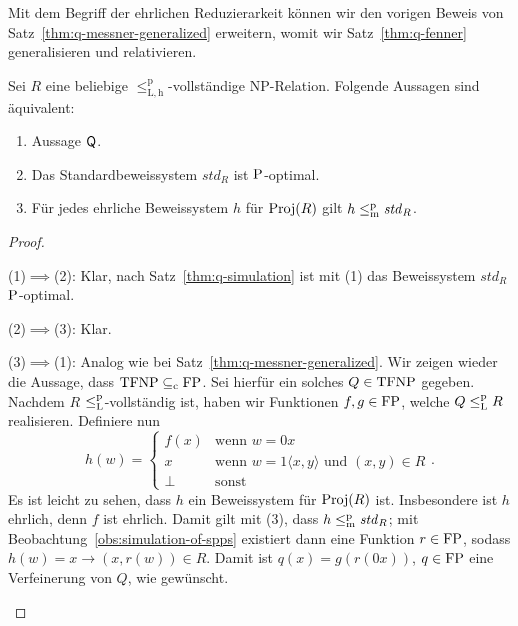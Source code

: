 Mit dem Begriff der ehrlichen Reduzierarkeit können wir den vorigen Beweis von Satz~\ref{thm:q-messner-generalized} erweitern, womit wir Satz~\ref{thm:q-fenner} generalisieren und relativieren. 
\begin{theorem}\label{thm:q-fenner-generalized}
    Sei $R$ eine beliebige $\leq_\mathrm{L,h}^\mathrm p$-vollständige NP-Relation.
    Folgende Aussagen sind äquivalent:
    \begin{enumerate}
        \item Aussage $\hQ$.
        \item Das Standardbeweissystem $\mathit{std}_R$ ist $\P$-optimal.
        \item Für jedes ehrliche Beweissystem $h$ für $\Proj(R)$ gilt $h\leqmp \mathit{std}_R$.
    \end{enumerate}
\end{theorem}
\begin{proof}
    \begin{prooflist}
    \item (1)$\implies$(2): Klar, nach Satz~\ref{thm:q-simulation} ist mit (1) das Beweissystem $\mathit{std}_R$ $\P$-optimal.

        \item (2)$\implies$(3): Klar.

        \item (3)$\implies$(1): Analog wie bei Satz~\ref{thm:q-messner-generalized}.
            Wir zeigen wieder die Aussage, dass $\TFNP\subseteqc\FP$. Sei hierfür ein solches $Q\in\TFNP$ gegeben.
    Nachdem $R$ $\leqlp$-vollständig ist, haben wir Funktionen $f,g\in\FP$, welche $Q\leqlp R$ realisieren.
    Definiere nun
    \[ h(w) = \begin{cases} f(x) & \text{wenn $w=0x$}\\ x & \text{wenn $w=1\langle x, y\rangle$ und $(x,y)\in R$} \\  \bot & \text{sonst} \end{cases}.\]
    Es ist leicht zu sehen, dass $h$ ein Beweissystem für $\Proj(R)$ ist.
    Insbesondere ist $h$ ehrlich, denn $f$ ist ehrlich.
    Damit gilt mit (3), dass $h\leqmp \mathit{std}_R$; mit Beobachtung~\ref{obs:simulation-of-spps} existiert dann eine Funktion $r\in\FP$, sodass
    $h(w)=x \rightarrow (x, r(w))\in R$.
    Damit ist $q(x) = g(r(0x))$, $q\in\FP$ eine Verfeinerung von $Q$, wie gewünscht.
    \end{prooflist}
\end{proof}

